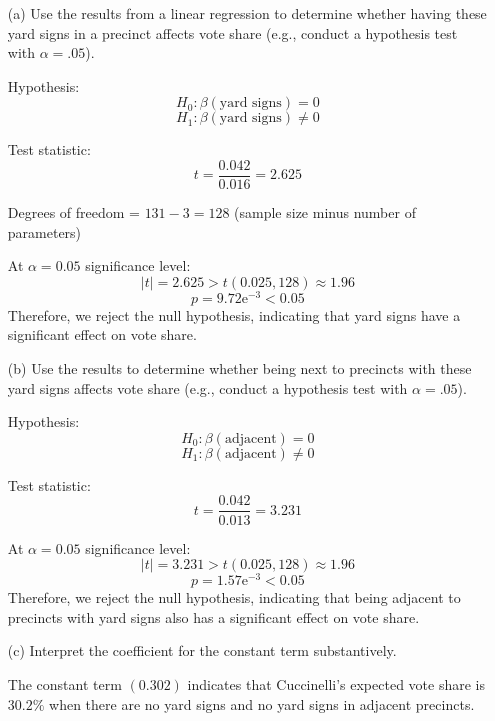 \documentclass[12pt,letterpaper]{article}
\begin{document}
\vspace{.5cm}
\begin{enumerate}
	\newpage		
	\item [(a)] Use the results from a linear regression to determine whether having these yard signs in a precinct affects vote share (e.g., conduct a hypothesis test with $\alpha = .05$).
	
	\vspace{.5cm}
	Hypothesis:
	$$
	H_0: \beta(\text{yard signs}) = 0
	$$
	$$
	H_1: \beta(\text{yard signs}) \neq 0
	$$
	
	Test statistic:
	$$
	t = \frac{0.042}{0.016} = 2.625
	$$
	
	Degrees of freedom = $131 - 3 = 128$ (sample size minus number of parameters)
	
	
	
	At $\alpha = 0.05$ significance level:
	$$
	|t| = 2.625 > t(0.025,128) \approx 1.96
	$$	
	$$
	p = 9.72\mathrm{e}^{-3} < 0.05
	$$
	Therefore, we reject the null hypothesis, indicating that yard signs have a significant effect on vote share.
	
    \vspace{.5cm}
	\item [(b)]  Use the results to determine whether being
	next to precincts with these yard signs affects vote
	share (e.g., conduct a hypothesis test with $\alpha = .05$).
	
	\vspace{.5cm}
	Hypothesis:
	$$
	H_0: \beta(\text{adjacent}) = 0
	$$
	$$
	H_1: \beta(\text{adjacent}) \neq 0
	$$
	
	Test statistic:
	$$
	t = \frac{0.042}{0.013} = 3.231
	$$
	
	
	
	At $\alpha = 0.05$ significance level:
	$$
	|t| = 3.231 > t(0.025,128) \approx 1.96
	$$
	$$
		p = 1.57\mathrm{e}^{-3}< 0.05
	$$
	Therefore, we reject the null hypothesis, indicating that being adjacent to precincts with yard signs also has a significant effect on vote share.
	
	\vspace{.5cm}
	\item [(c)] Interpret the coefficient for the constant term substantively.
	\vspace{.5cm}
	
	The constant term $(0.302)$ indicates that Cuccinelli's expected vote share is $30.2\%$ when there are no yard signs and no yard signs in adjacent precincts.
	

\end{enumerate}
\end{document}
